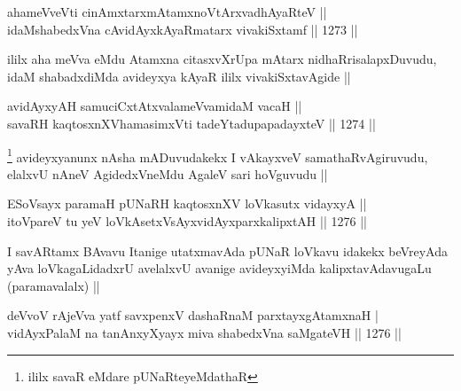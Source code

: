 \begin{shl}
ahameVveVti cinAmxtarxmAtamxnoV\s tArxvadhAyaRteV || \\
idaMshabedxVna cAvidAyxkAyaRmatarx vivakiSxtamf ||  1273 ||  
\end{shl}

\begin{artha}
ililx aha meVva eMdu Atamxna citasxvXrUpa mAtarx nidhaRrisalapxDuvudu, idaM shabadxdiMda avideyxya kAyaR ililx vivakiSxtavAgide ||
\end{artha}


\begin{shl}
avidAyxyAH samuciCxtAtxvalameVvamidaM vacaH || \\
savaRH kaqtosxnXV\s hamasimxVti tadeYtadupapadayxteV ||  1274 ||  
\end{shl}

\begin{artha}
\footnote{ililx savaR eMdare pUNaRteyeMdathaR}
avideyxyanunx nAsha mADuvudakekx I vAkayxveV samathaRvAgiruvudu, elalxvU nAneV AgidedxVneMdu AgaleV sari hoVguvudu ||
\end{artha}


\begin{shl}
ESoV\s sayx paramaH pUNaRH kaqtosxnXV loVkasutx vidayxyA || \\
itoV\s pareV tu yeV loVkAsetxV\s sAyxvidAyxparxkalipxtAH ||  1276 ||  
\end{shl}

\begin{artha}
I savARtamx BAvavu Itanige utatxmavAda pUNaR loVkavu idakekx beVreyAda yAva loVkagaLidadxrU avelalxvU avanige avideyxyiMda kalipxtavAdavugaLu (paramavalalx) ||
\end{artha}


\begin{shl}
deVvoV rAjeVva yatf savxpenxV dashaRnaM parxtayxgAtamxnaH |‍‍ \\
vidAyxPalaM na tanAnxyXyayx miva shabedxVna saMgateVH || 1276 ||
\end{shl}

